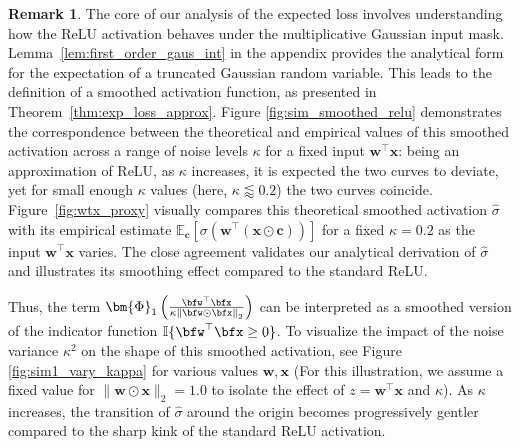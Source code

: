 \documentclass[10pt]{article} %
\theoremstyle{definition}
\newtheorem{remark}[theorem]{Remark}
\theoremstyle{plain}
\newcommand{\norm}[1]{\left\|#1\right\|}
\begin{document}
\begin{remark}
The core of our analysis of the expected loss involves understanding how the ReLU activation behaves under the multiplicative Gaussian input mask. Lemma~\ref{lem:first_order_gaus_int} in the appendix provides the analytical form for the expectation of a truncated Gaussian random variable. 
This leads to the definition of a smoothed activation function, as presented in Theorem~\ref{thm:exp_loss_approx}.
Figure \ref{fig:sim_smoothed_relu} demonstrates the correspondence between the theoretical and empirical values of this smoothed activation across a range of noise levels $\kappa$ for a fixed input $\mathbf{w}^\top\mathbf{x}$: being an approximation of ReLU, as $\kappa$ increases, it is expected the two curves to deviate, yet for small enough $\kappa$ values (here, $\kappa \lessapprox 0.2$) the two curves coincide.
Figure~\ref{fig:wtx_proxy} visually compares this theoretical smoothed activation $\hat{\sigma}$ with its empirical estimate $\mathbb{E}_{\mathbf{c}}[\sigma(\mathbf{w}^\top(\mathbf{x} \odot \mathbf{c}))]$ for a fixed $\kappa=0.2$ as the input $\mathbf{w}^\top\mathbf{x}$ varies. 
The close agreement validates our analytical derivation of $\hat{\sigma}$ and illustrates its smoothing effect compared to the standard ReLU. 

Thus, the term $\bm{\Phi}_1\left(\frac{\bfw^\top\bfx}{\kappa\norm{\bfw\odot\bfx}_2}\right)$ can be interpreted as a smoothed version of the indicator function $\mathbb{I}\{\bfw^\top\bfx \geq 0\}$. 
To visualize the impact of the noise variance $\kappa^2$ on the shape of this smoothed activation, see Figure \ref{fig:sim1_vary_kappa} for various values $\mathbf{w}, \mathbf{x}$ (For this illustration, we assume a fixed value for $\|\mathbf{w}\odot\mathbf{x}\|_2=1.0$ to isolate the effect of $z = \mathbf{w}^\top\mathbf{x}$ and $\kappa$). 
As $\kappa$ increases, the transition of $\hat{\sigma}$ around the origin becomes progressively gentler compared to the sharp kink of the standard ReLU activation.
\end{remark}
\end{document}
